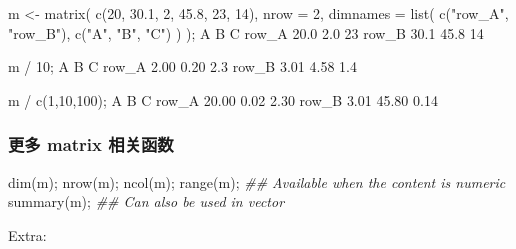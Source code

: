 \documentclass[
]{article}
\newenvironment{Shaded}{}{}
\newcommand{\AttributeTok}[1]{\textcolor[rgb]{0.49,0.56,0.16}{#1}}
\newcommand{\DecValTok}[1]{\textcolor[rgb]{0.25,0.63,0.44}{#1}}
\newcommand{\DocumentationTok}[1]{\textcolor[rgb]{0.73,0.13,0.13}{\textit{#1}}}
\newcommand{\FloatTok}[1]{\textcolor[rgb]{0.25,0.63,0.44}{#1}}
\newcommand{\FunctionTok}[1]{\textcolor[rgb]{0.02,0.16,0.49}{#1}}
\newcommand{\NormalTok}[1]{#1}
\newcommand{\OtherTok}[1]{\textcolor[rgb]{0.00,0.44,0.13}{#1}}
\newcommand{\SpecialCharTok}[1]{\textcolor[rgb]{0.25,0.44,0.63}{#1}}
\newcommand{\StringTok}[1]{\textcolor[rgb]{0.25,0.44,0.63}{#1}}
\begin{document}
\begin{Shaded}
\begin{Highlighting}[]
\NormalTok{m }\OtherTok{\textless{}{-}} \FunctionTok{matrix}\NormalTok{( }\FunctionTok{c}\NormalTok{(}\DecValTok{20}\NormalTok{, }\FloatTok{30.1}\NormalTok{, }\DecValTok{2}\NormalTok{, }\FloatTok{45.8}\NormalTok{, }\DecValTok{23}\NormalTok{, }\DecValTok{14}\NormalTok{), }\AttributeTok{nrow =} \DecValTok{2}\NormalTok{, }
       \AttributeTok{dimnames =} \FunctionTok{list}\NormalTok{( }\FunctionTok{c}\NormalTok{(}\StringTok{"row\_A"}\NormalTok{, }\StringTok{"row\_B"}\NormalTok{), }\FunctionTok{c}\NormalTok{(}\StringTok{"A"}\NormalTok{, }\StringTok{"B"}\NormalTok{, }\StringTok{"C"}\NormalTok{) ) );}
\NormalTok{A	B	C}
\NormalTok{row\_A	}\FloatTok{20.0}	\FloatTok{2.0}	\DecValTok{23}
\NormalTok{row\_B	}\FloatTok{30.1}	\FloatTok{45.8}	\DecValTok{14}

\NormalTok{m }\SpecialCharTok{/} \DecValTok{10}\NormalTok{;}
\NormalTok{ A    B   C}
\NormalTok{row\_A }\FloatTok{2.00} \FloatTok{0.20} \FloatTok{2.3}
\NormalTok{row\_B }\FloatTok{3.01} \FloatTok{4.58} \FloatTok{1.4}

\NormalTok{m }\SpecialCharTok{/}  \FunctionTok{c}\NormalTok{(}\DecValTok{1}\NormalTok{,}\DecValTok{10}\NormalTok{,}\DecValTok{100}\NormalTok{);}
\NormalTok{A     B    C}
\NormalTok{row\_A }\FloatTok{20.00}  \FloatTok{0.02} \FloatTok{2.30}
\NormalTok{row\_B  }\FloatTok{3.01} \FloatTok{45.80} \FloatTok{0.14}
\end{Highlighting}
\end{Shaded}

\hypertarget{ux66f4ux591a--matrix-ux76f8ux5173ux51fdux6570}{%
\subsubsection{更多 matrix
相关函数}\label{ux66f4ux591a--matrix-ux76f8ux5173ux51fdux6570}}

\begin{Shaded}
\begin{Highlighting}[]
\FunctionTok{dim}\NormalTok{(m);}
\FunctionTok{nrow}\NormalTok{(m);}
\FunctionTok{ncol}\NormalTok{(m);}
\FunctionTok{range}\NormalTok{(m); }\DocumentationTok{\#\# Available when the content is numeric}
\FunctionTok{summary}\NormalTok{(m); }\DocumentationTok{\#\# Can also be used in vector}
\end{Highlighting}
\end{Shaded}

Extra:
\end{document}
